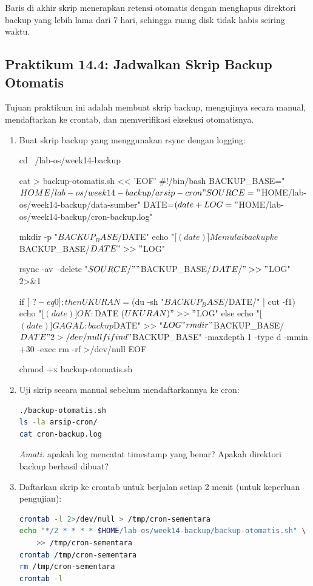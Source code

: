 Baris  di akhir skrip menerapkan retensi otomatis dengan menghapus
direktori backup yang lebih lama dari 7 hari, sehingga ruang disk tidak habis
seiring waktu.

\subsection*{Praktikum 14.4: Jadwalkan Skrip Backup Otomatis}

Tujuan praktikum ini adalah membuat skrip backup, mengujinya secara manual,
mendaftarkan ke crontab, dan memverifikasi eksekusi otomatisnya.

\begin{enumerate}
    \item Buat skrip backup yang menggunakan rsync dengan logging:
\begin{longlisting}[language=bash, caption={Membuat skrip backup otomatis}]
cd ~/lab-os/week14-backup

cat > backup-otomatis.sh << 'EOF'
#!/bin/bash
BACKUP_BASE="$HOME/lab-os/week14-backup/arsip-cron"
SOURCE="$HOME/lab-os/week14-backup/data-sumber"
DATE=$(date +%
LOG="$HOME/lab-os/week14-backup/cron-backup.log"

mkdir -p "$BACKUP_BASE/$DATE"
echo "[$(date)] Memulai backup ke $BACKUP_BASE/$DATE" >> "$LOG"

rsync -av --delete "$SOURCE/" "$BACKUP_BASE/$DATE/" >> "$LOG" 2>&1

if [ $? -eq 0 ]; then
    UKURAN=$(du -sh "$BACKUP_BASE/$DATE/" | cut -f1)
    echo "[$(date)] OK: $DATE ($UKURAN)" >> "$LOG"
else
    echo "[$(date)] GAGAL: backup $DATE" >> "$LOG"
    rmdir "$BACKUP_BASE/$DATE" 2>/dev/null
fi

find "$BACKUP_BASE" -maxdepth 1 -type d -mmin +30 -exec rm -rf {} >/dev/null
EOF

chmod +x backup-otomatis.sh
\end{longlisting}

    \item Uji skrip secara manual sebelum mendaftarkannya ke cron:
\begin{lstlisting}[language=bash, caption={Uji eksekusi manual skrip backup}]
./backup-otomatis.sh
ls -la arsip-cron/
cat cron-backup.log
\end{lstlisting}
    \textit{Amati:} apakah log mencatat timestamp yang benar? Apakah direktori
    backup berhasil dibuat?

    \item Daftarkan skrip ke crontab untuk berjalan setiap 2 menit (untuk
        keperluan pengujian):
\begin{lstlisting}[language=bash, caption={Mendaftarkan skrip ke crontab}]
crontab -l 2>/dev/null > /tmp/cron-sementara
echo "*/2 * * * * $HOME/lab-os/week14-backup/backup-otomatis.sh" \
    >> /tmp/cron-sementara
crontab /tmp/cron-sementara
rm /tmp/cron-sementara
crontab -l
\end{lstlisting}


\end{enumerate}

